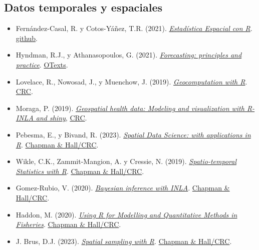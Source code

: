 \documentclass[
]{book}
\theoremstyle{break}
\theoremstyle{nonumberplain}
\begin{document}
\subsection*{Datos temporales y espaciales}\label{datos-temporales-y-espaciales}

\begin{itemize}
\item
  Fernández-Casal, R. y Cotos-Yáñez, T.R. (2021). \emph{\href{https://rubenfcasal.github.io/estadistica_espacial}{Estadística Espacial con R}}. \href{https://github.com/rubenfcasal/estadistica_espacial}{github}.
\item
  Hyndman, R.J., y Athanasopoulos, G. (2021). \emph{\href{https://otexts.com/fpp3}{Forecasting: principles and practice}}. \href{https://www.amazon.es/dp/0987507133}{OTexts}.
\item
  Lovelace, R., Nowosad, J., y Muenchow, J. (2019). \emph{\href{https://geocompr.robinlovelace.net}{Geocomputation with R}}. \href{https://www.routledge.com/9781138304512}{CRC}.
\item
  Moraga, P. (2019). \emph{\href{https://www.paulamoraga.com/book-geospatial}{Geospatial health data: Modeling and visualization with R-INLA and shiny}}, \href{https://www.routledge.com/9780367357955}{CRC}.
\item
  Pebesma, E., y Bivand, R. (2023). \emph{\href{https://keen-swartz-3146c4.netlify.app}{Spatial Data Science: with applications in R}}. \href{https://www.routledge.com/p/book/9781138311183}{Chapman \& Hall/CRC}.
\item
  Wikle, C.K., Zammit-Mangion, A. y Cressie, N. (2019). \emph{\href{https://spacetimewithr.org}{Spatio-temporal Statistics with R}}. \href{}{Chapman \& Hall/CRC}.
\item
  Gomez-Rubio, V. (2020). \emph{\href{https://becarioprecario.bitbucket.io/inla-gitbook/}{Bayesian inference with INLA}}. \href{https://www.routledge.com/p/book/9781138039872}{Chapman \& Hall/CRC}.
\item
  Haddon, M. (2020). \emph{\href{https://haddonm.github.io/URMQMF/}{Using R for Modelling and Quantitative Methods in Fisheries}}. \href{https://www.routledge.com/p/book/9780367469887}{Chapman \& Hall/CRC}.
\item
  J. Brus, D.J. (2023). \emph{\href{https://dickbrus.github.io/SpatialSamplingwithR/}{Spatial sampling with R}}. \href{https://www.routledge.com/p/book/9781032193854}{Chapman \& Hall/CRC}.
\end{itemize}
\end{document}
